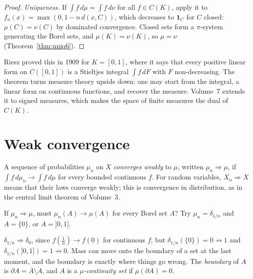 \begin{proof}
\emph{Uniqueness.} If $\int f\,d\mu=\int f\,d\nu$ for all $f\in C(K)$, apply it to $f_n(x)=\max(0,1-n\,d(x,C))$, which decreases to $\mathbf 1_C$ for $C$ closed: $\mu(C)=\nu(C)$ by dominated convergence. Closed sets form a
$\pi$-system generating the Borel sets, and $\mu(K)=\nu(K)$, so $\mu=\nu$ (Theorem~\ref{thm:uniq6}).
\end{proof}

Riesz proved this in 1909 for $K=[0,1]$, where it says that every positive linear form on $C([0,1])$ is a Stieltjes integral $\int f\,dF$ with $F$ non-decreasing. The theorem turns measure theory upside down:
one may start from the integral, a linear form on continuous functions, and recover the measure. Volume~7 extends it to signed measures, which makes the space of finite measures the dual of $C(K)$.

\section{Weak convergence}

A sequence of probabilities $\mu_n$ on $X$ \emph{converges weakly} to $\mu$, written $\mu_n\Rightarrow\mu$, if $\int f\,d\mu_n\to\int f\,d\mu$ for every bounded continuous $f$. For random variables, $X_n\Rightarrow X$ means that
their laws converge weakly; this is convergence in distribution, as in the central limit theorem of Volume~3.

\begin{think}
If $\mu_n\Rightarrow\mu$, must $\mu_n(A)\to\mu(A)$ for every Borel set $A$? Try $\mu_n=\delta_{1/n}$ and $A=\{0\}$, or $A=]0,1]$.
\end{think}

$\delta_{1/n}\Rightarrow\delta_0$, since $f(\frac1n)\to f(0)$ for continuous $f$; but $\delta_{1/n}(\{0\})=0\not\to1$ and $\delta_{1/n}(]0,1])=1\not\to0$. Mass can move onto the boundary of a set at the last moment, and the boundary is
exactly where things go wrong. The \emph{boundary} of $A$ is $\partial A=\overline A\setminus\mathring A$, and $A$ is a \emph{$\mu$-continuity set} if $\mu(\partial A)=0$.

